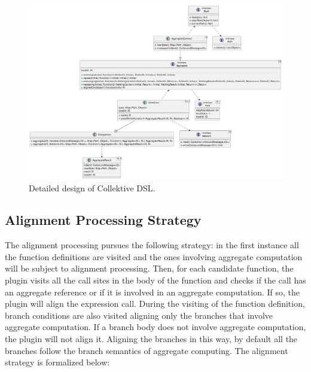 \begin{figure}
    \centering
    \includegraphics[width=\linewidth]{figures/collektive-design.pdf}
    \caption{Detailed design of Collektive DSL.}
    \label{fig:collektive-design}
\end{figure}

\subsection{Alignment Processing Strategy}

The alignment processing pursues the following strategy: in the first instance all the function definitions are visited and the ones involving aggregate computation will be subject to alignment processing. Then, for each candidate function, the plugin visits all the call sites in the body of the function and checks if the call has an aggregate reference or if it is involved in an aggregate computation. If so, the plugin will align the expression call. During the visiting of the function definition, branch conditions are also visited aligning only the branches that involve aggregate computation. If a branch body does not involve aggregate computation, the plugin will not align it. Aligning the branches in this way, by default all the branches follow the branch semantics of aggregate computing. The alignment strategy is formalized below:

